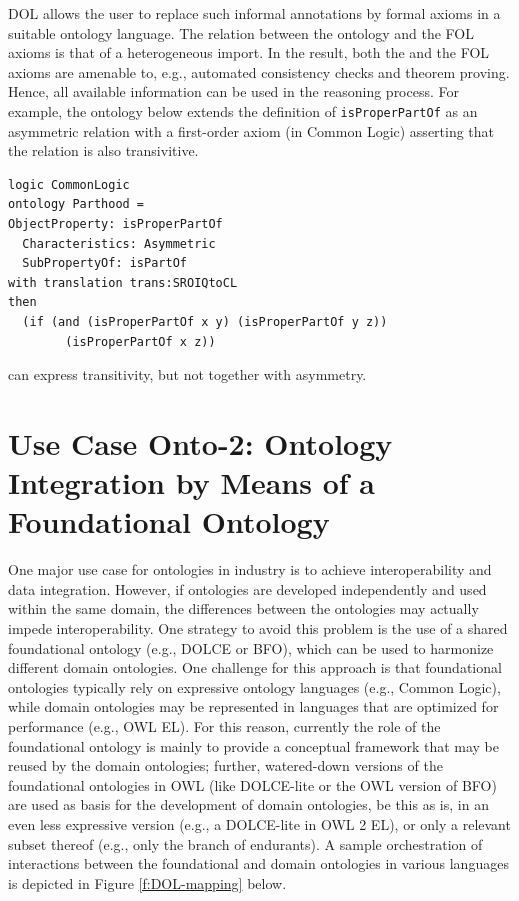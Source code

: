 \documentclass[10pt,fleqn,%
\ifpretendfinal
final%
\else
draft%
\fi,
]{scrreprt}
\begin{document}
DOL allows the user to replace such informal annotations by formal axioms in a suitable ontology 
language. The relation between the \OWL ontology and the FOL axioms is that of a heterogeneous 
import. In the result, both the \OWL and the FOL axioms are amenable to, e.g., automated consistency 
checks and theorem proving. Hence, all available information can be used in the reasoning process.
For example, the ontology below extends the \OWL definition of \texttt{isProperPartOf} as an asymmetric relation
with a first-order axiom (in Common Logic) asserting that the relation is also transivitive.
\begin{lstlisting}[basicstyle=\small\ttfamily,language=dolText,morekeywords={logic,ontology,props,ObjectProperty,Class,DisjointUnionOf,SubClassOf,Characteristics,Transitive,Asymmetric,SubPropertyOf,DisjointClasses,EquivalentTo,inverse,only,forall,iff,if,or,exists},escapechar=@,mathescape]
logic CommonLogic
ontology Parthood =
ObjectProperty: isProperPartOf  
  Characteristics: Asymmetric  
  SubPropertyOf: isPartOf 
with translation trans:SROIQtoCL
then
  (if (and (isProperPartOf x y) (isProperPartOf y z)) 
        (isProperPartOf x z))
\end{lstlisting}
\OWL can express transitivity, but not together with asymmetry.

\section{Use Case Onto-2: Ontology Integration by Means of a Foundational Ontology}
One major use case for ontologies in industry is to achieve interoperability and data integration. 
However, if ontologies are developed independently and used  within the same domain, the 
differences between the ontologies may actually impede interoperability. One strategy to avoid this 
problem is the use of a shared  foundational ontology (e.g., DOLCE or BFO), which can be used to 
harmonize different domain ontologies. One challenge for this approach is that foundational 
ontologies typically rely on expressive ontology languages (e.g., Common Logic), while domain 
ontologies may be represented in languages that are optimized for performance (e.g., OWL EL). For 
this reason, currently the role of the foundational ontology is mainly to provide a conceptual 
framework that may be reused by the  domain ontologies; further, watered-down versions of the 
foundational ontologies in OWL (like DOLCE-lite or the OWL version of BFO) are used as basis for 
the  development of domain ontologies, be this as is, in an even less expressive version (e.g., a 
DOLCE-lite in OWL 2 EL), or only a relevant subset thereof (e.g., only the branch of endurants). A 
sample orchestration of interactions between the foundational and domain ontologies in various 
languages is depicted in Figure \ref{f:DOL-mapping} below.
\end{document}
